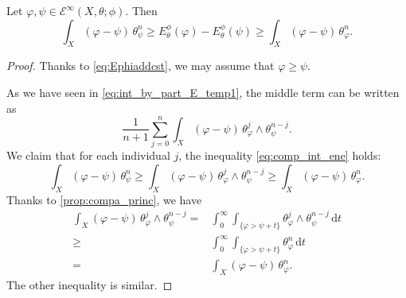 \begin{lemma}\label{lma:comp_int_ene}
    Let $\varphi,\psi\in \mathcal{E}^{\infty}(X,\theta;\phi)$. Then
    \begin{equation}\label{eq:comp_int_ene}
    \int_X (\varphi-\psi)\,\theta_{\psi}^n \geq E_{\theta}^{\phi}(\varphi)-E_{\theta}^{\phi}(\psi)\geq \int_X (\varphi-\psi)\,\theta_{\varphi}^n.
    \end{equation}
\end{lemma}
\begin{proof}
    Thanks to \eqref{eq:Ephiaddcst}, we may assume that $\varphi\geq \psi$.

       As we have seen in \eqref{eq:int_by_part_E_temp1}, the middle term can be written as
       \[
       \frac{1}{n+1}\sum_{j=0}^n \int_X(\varphi-\psi)\,\theta_{\varphi}^j\wedge \theta_{\psi}^{n-j}.
       \]
       We claim that for each individual $j$, the inequality \eqref{eq:comp_int_ene} holds:
       \[
       \int_X (\varphi-\psi)\,\theta_{\psi}^n \geq \int_X(\varphi-\psi)\,\theta_{\varphi}^j\wedge \theta_{\psi}^{n-j} \geq \int_X (\varphi-\psi)\,\theta_{\varphi}^n.
       \]
       Thanks to \cref{prop:compa_princ}, we have
       \[
       \begin{aligned}
       \int_X(\varphi-\psi)\,\theta_{\varphi}^j\wedge \theta_{\psi}^{n-j}=&\int_0^{\infty} \int_{\{\varphi>\psi+t\}} \theta_{\varphi}^j\wedge \theta_{\psi}^{n-j}\,\mathrm{d}t\\
       \geq & \int_0^{\infty} \int_{\{\varphi>\psi+t\}} \theta_{\varphi}^n\,\mathrm{d}t \\
       =& \int_X (\varphi-\psi)\,\theta_{\varphi}^n.
       \end{aligned}
       \]
       The other inequality is similar.
\end{proof}


